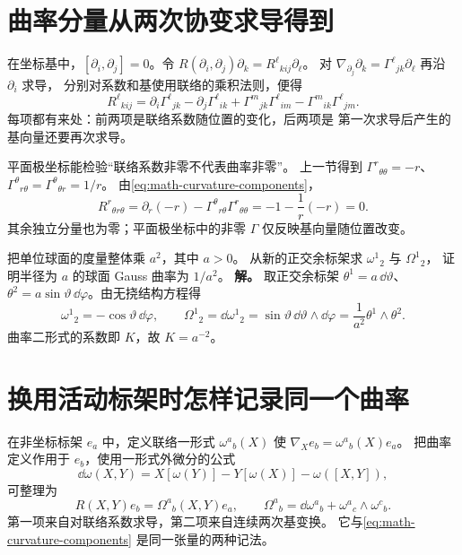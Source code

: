 \section{曲率分量从两次协变求导得到}
\label{sec:math-curvature-components}

在坐标基中，\([\partial_i,\partial_j]=0\)。令
\(R(\partial_i,\partial_j)\partial_k
=R^\ell{}_{kij}\partial_\ell\)。
对 \(\nabla_{\partial_j}\partial_k
=\Gamma^\ell{}_{jk}\partial_\ell\) 再沿 \(\partial_i\) 求导，
分别对系数和基使用联络的乘积法则，便得
\begin{equation}
R^\ell{}_{kij}
=\partial_i\Gamma^\ell{}_{jk}
-\partial_j\Gamma^\ell{}_{ik}
+\Gamma^m{}_{jk}\Gamma^\ell{}_{im}
-\Gamma^m{}_{ik}\Gamma^\ell{}_{jm}.
\label{eq:math-curvature-components}
\end{equation}
每项都有来处：前两项是联络系数随位置的变化，后两项是
第一次求导后产生的基向量还要再次求导。

平面极坐标能检验“联络系数非零不代表曲率非零”。
上一节得到 \(\Gamma^r{}_{\theta\theta}=-r\)、
\(\Gamma^\theta{}_{r\theta}
=\Gamma^\theta{}_{\theta r}=1/r\)。
由\cref{eq:math-curvature-components}，
\[
R^r{}_{\theta r\theta}
=\partial_r(-r)
-\Gamma^\theta{}_{r\theta}\Gamma^r{}_{\theta\theta}
=-1-\frac1r(-r)=0.
\]
其余独立分量也为零；平面极坐标中的非零 \(\Gamma\)
仅反映基向量随位置改变。


\par
\begin{workedexample}
把单位球面的度量整体乘 \(a^2\)，其中 \(a>0\)。
从新的正交余标架求 \(\omega^1{}_2\) 与 \(\Omega^1{}_2\)，
证明半径为 \(a\) 的球面 Gauss 曲率为 \(1/a^2\)。
\textbf{解。} 取正交余标架 \(\theta^1=a\,\dd\vartheta\)、\(\theta^2=a\sin\vartheta\,\dd\varphi\)。由无挠结构方程得
\[
\omega^1{}_2=-\cos\vartheta\,\dd\varphi,\qquad
\Omega^1{}_2=\dd\omega^1{}_2
=\sin\vartheta\,\dd\vartheta\wedge\dd\varphi
=\frac1{a^2}\theta^1\wedge\theta^2.
\]
曲率二形式的系数即 \(K\)，故 \(K=a^{-2}\)。
\end{workedexample}
\par
\section{换用活动标架时怎样记录同一个曲率}

在非坐标标架 \(e_a\) 中，定义联络一形式
\(\omega^a{}_b(X)\) 使
\(\nabla_Xe_b=\omega^a{}_b(X)e_a\)。
把曲率定义作用于 \(e_b\)，使用一形式外微分的公式
\[
\dd\omega(X,Y)
=X[\omega(Y)]-Y[\omega(X)]-\omega([X,Y]),
\]
可整理为
\[
R(X,Y)e_b=\Omega^a{}_b(X,Y)e_a,\qquad
\Omega^a{}_b=\dd\omega^a{}_b+\omega^a{}_c\wedge\omega^c{}_b.
\]
第一项来自对联络系数求导，第二项来自连续两次基变换。
它与\cref{eq:math-curvature-components} 是同一张量的两种记法。

